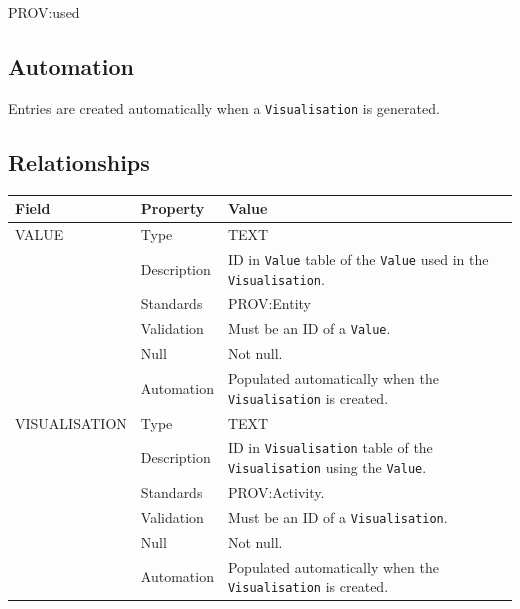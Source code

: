 \documentclass[
]{article}
\newcounter{none}
\begin{document}
PROV:used

\subsection{Automation}\label{automation-43}

Entries are created automatically when a \texttt{Visualisation} is
generated.

\subsection{Relationships}\label{relationships-34}

{\def\LTcaptype{none} 
\begin{longtable}[]{@{}
  >{\raggedright\arraybackslash}p{}
  >{\raggedright\arraybackslash}p{}
  >{\raggedright\arraybackslash}p{}@{}}
\toprule\noalign{}
\begin{minipage}[b]{\linewidth}\raggedright
Field
\end{minipage} & \begin{minipage}[b]{\linewidth}\raggedright
Property
\end{minipage} & \begin{minipage}[b]{\linewidth}\raggedright
Value
\end{minipage} \\
\midrule\noalign{}
\endhead
\bottomrule\noalign{}
\endlastfoot
VALUE & Type & TEXT \\
& Description & ID in \texttt{Value} table of the \texttt{Value} used in
the \texttt{Visualisation}. \\
& Standards & PROV:Entity \\
& Validation & Must be an ID of a \texttt{Value}. \\
& Null & Not null. \\
& Automation & Populated automatically when the \texttt{Visualisation}
is created. \\
VISUALISATION & Type & TEXT \\
& Description & ID in \texttt{Visualisation} table of the
\texttt{Visualisation} using the \texttt{Value}. \\
& Standards & PROV:Activity. \\
& Validation & Must be an ID of a \texttt{Visualisation}. \\
& Null & Not null. \\
& Automation & Populated automatically when the \texttt{Visualisation}
is created. \\
\end{longtable}
}

\renewcommand\refname{Bibliography}

\end{document}
